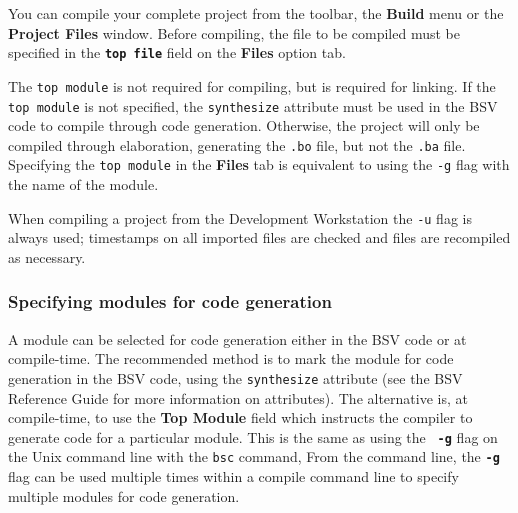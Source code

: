 \documentclass{article}
\newcommand{\te}[1]{\texttt{#1}}
\begin{document}
You can compile your complete project from the toolbar, the {\bf Build}  menu or the
{\bf Project Files} window. Before compiling,  the file to be compiled
must be specified in the {\bf\tt top file} field on the {\bf Files} option
tab.

  The \te{top module} is not required for compiling,
but is required for linking.  If the  \te{top module} is not
specified, the \te{synthesize} attribute must be used in the BSV code
to compile through code generation.  Otherwise, the project will only
be compiled through elaboration, generating the \te{.bo} file, but
not the \te{.ba} file.  Specifying the \te{top module} in the {\bf Files}
tab is equivalent to using the \te{-g} flag with the name of the
 module.



 When compiling a project from the Development Workstation the \te{-u}
 flag is  always used;  timestamps on all imported
files are checked and files are recompiled as necessary.



\subsubsection{Specifying modules for code generation}
\label{spec-code-gen}
\index{-g@\te{-g} (compiler flag)}

A module can be selected for code generation either in the BSV code or
at compile-time.  The recommended method is to mark the module for
code generation in the BSV code, using the \te{synthesize} attribute
(see the BSV Reference Guide for more information on
attributes).  The alternative is, at compile-time, to use the {\bf Top
Module} field  which  instructs the compiler to generate code for a
particular module.  This is the same as using the  {\bf\tt
-g} flag on the Unix command line with the \te{bsc} command, From the
command line, the {\bf\tt -g} flag can be used multiple times
within a compile
 command line to specify multiple modules for code generation.
\end{document}
